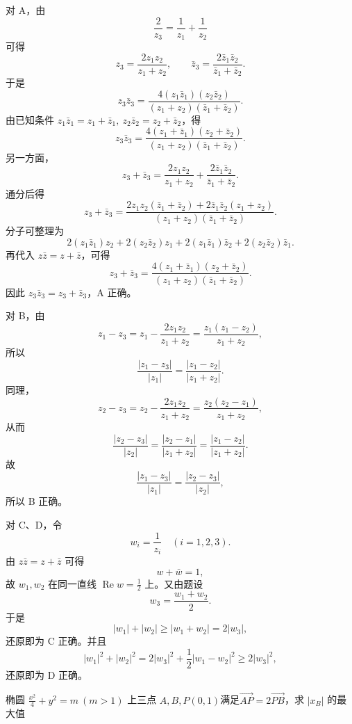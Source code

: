\begin{solution}
对 A，由
\[
\frac{2}{z_3}=\frac{1}{z_1}+\frac{1}{z_2}
\]
可得
\[
z_3=\frac{2z_1z_2}{z_1+z_2},\qquad \bar z_3=\frac{2\bar z_1\bar z_2}{\bar z_1+\bar z_2}.
\]
于是
\[
z_3\bar z_3=\frac{4(z_1\bar z_1)(z_2\bar z_2)}{(z_1+z_2)(\bar z_1+\bar z_2)}.
\]
由已知条件 $z_1\bar z_1=z_1+\bar z_1,\ z_2\bar z_2=z_2+\bar z_2$，得
\[
z_3\bar z_3=\frac{4(z_1+\bar z_1)(z_2+\bar z_2)}{(z_1+z_2)(\bar z_1+\bar z_2)}.
\]
另一方面，
\[
z_3+\bar z_3=\frac{2z_1z_2}{z_1+z_2}+\frac{2\bar z_1\bar z_2}{\bar z_1+\bar z_2}.
\]
通分后得
\[
z_3+\bar z_3
=\frac{2z_1z_2(\bar z_1+\bar z_2)+2\bar z_1\bar z_2(z_1+z_2)}{(z_1+z_2)(\bar z_1+\bar z_2)}.
\]
分子可整理为
\[
2(z_1\bar z_1)z_2+2(z_2\bar z_2)z_1+2(z_1\bar z_1)\bar z_2+2(z_2\bar z_2)\bar z_1.
\]
再代入 $z\bar z=z+\bar z$，可得
\[
z_3+\bar z_3=\frac{4(z_1+\bar z_1)(z_2+\bar z_2)}{(z_1+z_2)(\bar z_1+\bar z_2)}.
\]
因此 $z_3\bar z_3=z_3+\bar z_3$，A 正确。

对 B，由
\[
z_1-z_3=z_1-\frac{2z_1z_2}{z_1+z_2}
=\frac{z_1(z_1-z_2)}{z_1+z_2},
\]
所以
\[
\frac{|z_1-z_3|}{|z_1|}
=\frac{|z_1-z_2|}{|z_1+z_2|}.
\]
同理，
\[
z_2-z_3=z_2-\frac{2z_1z_2}{z_1+z_2}
=\frac{z_2(z_2-z_1)}{z_1+z_2},
\]
从而
\[
\frac{|z_2-z_3|}{|z_2|}
=\frac{|z_2-z_1|}{|z_1+z_2|}
=\frac{|z_1-z_2|}{|z_1+z_2|}.
\]
故
\[
\frac{|z_1-z_3|}{|z_1|}=\frac{|z_2-z_3|}{|z_2|},
\]
所以 B 正确。

对 C、D，令
\[
w_i=\frac1{z_i}\quad(i=1,2,3).
\]
由 $z\bar z=z+\bar z$ 可得
\[
w+\bar w=1,
\]
故 $w_1,w_2$ 在同一直线 $\operatorname{Re}w=\frac12$ 上。又由题设
\[
w_3=\frac{w_1+w_2}{2}.
\]
于是
\[
|w_1|+|w_2|\ge |w_1+w_2|=2|w_3|,
\]
还原即为 C 正确。并且
\[
|w_1|^2+|w_2|^2
=2|w_3|^2+\frac12|w_1-w_2|^2\ge2|w_3|^2,
\]
还原即为 D 正确。
\end{solution}
\begin{example}[抹茶T1]
    椭圆 $\frac{x^2}{4}+y^2=m\ (m>1)$ 上三点 $A,B,P(0,1)$满足$\overrightarrow{AP}=2\overrightarrow{PB}$，求 $|x_B|$ 的最大值
\end{example}
